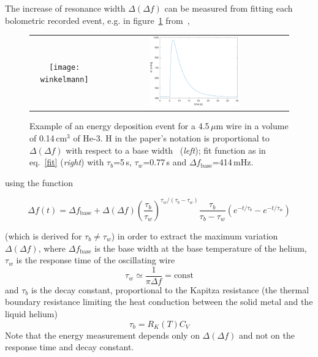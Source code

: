 \documentclass[a4paper,12pt]{article}
\begin{document}
The increase of resonance width $\Delta (\Delta f)$ can be measured from fitting each bolometric recorded event, e.g. in figure~\ref{fig:winkelmann} from~\cite{winkelmann},
\begin{figure}[!ht]
  \begin{center}
    \begin{tabular}{cc}
    \texttt{[image: winkelmann]} &
    \includegraphics[width=0.49\textwidth]{winkelmann_fit.pdf}
    \end{tabular}
  \end{center}
  \caption{Example of an energy deposition event for a 4.5\,$\mu$m wire in a volume of 0.14\,cm$^3$ of He-3. H in the paper's notation is proportional to $\Delta (\Delta f)$ with respect to a base width~\cite{winkelmann} (\textit{left}); fit function as in eq.~\ref{fit} (\textit{right}) with $\tau_b$=5\,s, $\tau_w$=0.77\,s and $\Delta f_\mathrm{base}$=414\,mHz.}
  \label{fig:winkelmann}
\end{figure}
using the function

\begin{equation}
  \Delta f(t)= \Delta f_\mathrm{base} + \Delta (\Delta f) {\left( \frac{\tau_b}{\tau_w} \right)}^{\tau_w/(\tau_b-\tau_w)} \frac{\tau_b}{\tau_b - \tau_w} \left( e^{-t/\tau_b} - e^{-t/\tau_w} \right)
\label{fit}
\end{equation}

(which is derived for $\tau_b \neq  \tau_w$) in order to extract the maximum variation $\Delta (\Delta f)$, where $\Delta f_\mathrm{base}$ is the base width at the base temperature of the helium, $\tau_w$ is the response time of the oscillating wire
\begin{equation}
  \tau_w \simeq \frac{1}{\pi \Delta f} = \mathrm{const}
\end{equation}
and $\tau_b$ is the decay constant, proportional to the Kapitza resistance (the thermal boundary resistance limiting the heat conduction between the solid metal and the liquid helium)
\begin{equation}
  \tau_b = R_K(T) C_V
\end{equation}
Note that the energy measurement depends only on $\Delta (\Delta f)$ and not on the response time and decay constant.
\end{document}
